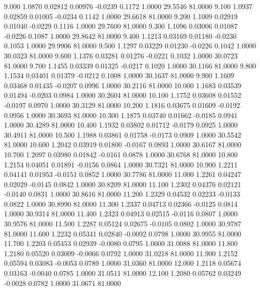    9.000   1.0870   0.02812   0.00976  -0.0239   0.1172   1.0000  29.5546  81.0000
   9.100   1.0937   0.02859   0.01005  -0.0234   0.1142   1.0000  29.6618  81.0000
   9.200   1.1009   0.02919   0.01040  -0.0229   0.1116   1.0000  29.7600  81.0000
   9.300   1.1096   0.03006   0.01087  -0.0226   0.1087   1.0000  29.8642  81.0000
   9.400   1.1213   0.03169   0.01180  -0.0230   0.1053   1.0000  29.9906  81.0000
   9.500   1.1297   0.03229   0.01230  -0.0226   0.1042   1.0000  30.0323  81.0000
   9.600   1.1376   0.03281   0.01276  -0.0221   0.1032   1.0000  30.0723  81.0000
   9.700   1.1455   0.03339   0.01325  -0.0217   0.1020   1.0000  30.1166  81.0000
   9.800   1.1534   0.03401   0.01379  -0.0212   0.1008   1.0000  30.1637  81.0000
   9.900   1.1609   0.03468   0.01435  -0.0207   0.0996   1.0000  30.2116  81.0000
  10.000   1.1683   0.03539   0.01494  -0.0203   0.0984   1.0000  30.2604  81.0000
  10.100   1.1752   0.03608   0.01552  -0.0197   0.0970   1.0000  30.3129  81.0000
  10.200   1.1816   0.03675   0.01609  -0.0192   0.0956   1.0000  30.3693  81.0000
  10.300   1.1875   0.03740   0.01662  -0.0185   0.0941   1.0000  30.4289  81.0000
  10.400   1.1932   0.03802   0.01712  -0.0179   0.0925   1.0000  30.4911  81.0000
  10.500   1.1988   0.03861   0.01758  -0.0173   0.0909   1.0000  30.5542  81.0000
  10.600   1.2042   0.03919   0.01800  -0.0167   0.0893   1.0000  30.6167  81.0000
  10.700   1.2097   0.03980   0.01842  -0.0161   0.0878   1.0000  30.6768  81.0000
  10.800   1.2154   0.04051   0.01891  -0.0156   0.0864   1.0000  30.7321  81.0000
  10.900   1.2211   0.04141   0.01953  -0.0151   0.0852   1.0000  30.7786  81.0000
  11.000   1.2261   0.04247   0.02029  -0.0145   0.0842   1.0000  30.8209  81.0000
  11.100   1.2302   0.04376   0.02121  -0.0140   0.0831   1.0000  30.8616  81.0000
  11.200   1.2329   0.04532   0.02233  -0.0133   0.0822   1.0000  30.8990  81.0000
  11.300   1.2337   0.04713   0.02366  -0.0125   0.0814   1.0000  30.9314  81.0000
  11.400   1.2323   0.04913   0.02515  -0.0116   0.0807   1.0000  30.9576  81.0000
  11.500   1.2287   0.05124   0.02675  -0.0105   0.0802   1.0000  30.9787  81.0000
  11.600   1.2232   0.05341   0.02840  -0.0092   0.0798   1.0000  30.9955  81.0000
  11.700   1.2203   0.05453   0.02939  -0.0080   0.0795   1.0000  31.0088  81.0000
  11.800   1.2180   0.05520   0.03009  -0.0066   0.0792   1.0000  31.0218  81.0000
  11.900   1.2152   0.05594   0.03083  -0.0053   0.0789   1.0000  31.0360  81.0000
  12.000   1.2118   0.05674   0.03163  -0.0040   0.0785   1.0000  31.0511  81.0000
  12.100   1.2080   0.05762   0.03249  -0.0028   0.0782   1.0000  31.0671  81.0000
